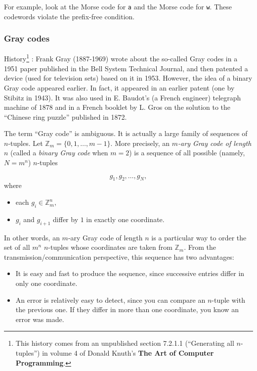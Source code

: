 For example, look at the Morse code for {\tt a} and the Morse code for
{\tt w}. These codewords violate the prefix-free condition.

\subsubsection{Gray codes}

History\footnote{This
history comes from an unpublished section 7.2.1.1
(``Generating all $n$-tuples'')
in volume 4 of Donald Knuth's {\bf The Art of Computer Programming}.
}
: Frank Gray (1887-1969) wrote about the so-called Gray codes in a
1951 paper published in the Bell System Technical Journal,
and then patented a device (used for television sets)
based on it in 1953. However, the idea of a binary Gray code
appeared earlier. In fact, it appeared in an earlier patent
(one by Stibitz in 1943). It was also used in E. Baudot's
(a French engineer) telegraph machine of 1878 and in
a French booklet by L. Gros on the solution to the
``Chinese ring puzzle'' published in 1872.

The term ``Gray code'' is ambiguous. It is actually a
large family of sequences of $n$-tuples. Let
${\mathbb{Z}}_m=\{0,1,\dots,m-1\}$. More precisely, an
{\it $m$-ary Gray code of length $n$} (called a {\it binary
Gray code} when $m=2$) is a sequence of
all possible (namely, $N=m^n$) $n$-tuples

\[
g_1,g_2,\dots, g_N,
\]
where
\begin{itemize}
\item
each $g_i\in {\mathbb{Z}}_m^n$,
\item
$g_i$ and $g_{i+1}$ differ by $1$ in exactly one
coordinate.
\end{itemize}
In other words, an $m$-ary Gray code of length
$n$ is a particular way to order the set of all
$m^n$ $n$-tuples whose coordinates are taken from
${\mathbb{Z}}_m$. From the transmission/communication
perspective, this sequence has two advantages:

\begin{itemize}
\item
It is easy and fast to produce the sequence, since
successive entries differ in only one coordinate.

\item
An error is relatively easy to detect, since you can
compare an $n$-tuple with the previous one. If they
differ in more than one coordinate, you know an error
was made.

\end{itemize}

